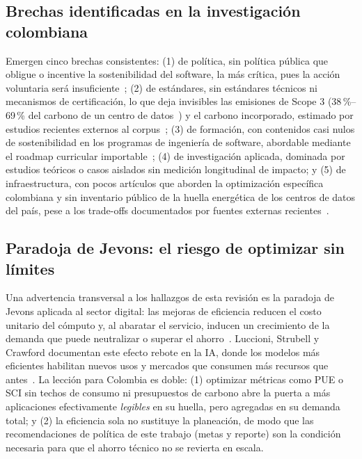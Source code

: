 \documentclass[conference]{IEEEtran}
\begin{document}
\subsection{Brechas identificadas en la investigaci\'on colombiana}\label{sec:brechasdis}
Emergen cinco brechas consistentes: (1) de pol\'itica, sin pol\'itica p\'ublica que obligue o incentive la sostenibilidad del software, la m\'as cr\'itica, pues la acci\'on voluntaria ser\'a insuficiente~\cite{maji2025}; (2) de est\'andares, sin est\'andares t\'ecnicos ni mecanismos de certificaci\'on, lo que deja invisibles las emisiones de Scope 3 (38\,\%--69\,\% del carbono de un centro de datos~\cite{lin2023}) y el carbono incorporado, estimado por estudios recientes externos al corpus~\cite{eilam2024}; (3) de formaci\'on, con contenidos casi nulos de sostenibilidad en los programas de ingenier\'ia de software, abordable mediante el roadmap curricular importable~\cite{moreira2024}; (4) de investigaci\'on aplicada, dominada por estudios te\'oricos o casos aislados sin medici\'on longitudinal de impacto; y (5) de infraestructura, con pocos art\'iculos que aborden la optimizaci\'on espec\'ifica colombiana y sin inventario p\'ublico de la huella energ\'etica de los centros de datos del pa\'is, pese a los trade-offs documentados por fuentes externas recientes~\cite{gnibga2024,torres2026}.

\subsection{Paradoja de Jevons: el riesgo de optimizar sin l\'imites}\label{sec:jevons}
Una advertencia transversal a los hallazgos de esta revisi\'on es la paradoja de Jevons aplicada al sector digital: las mejoras de eficiencia reducen el costo unitario del c\'omputo y, al abaratar el servicio, inducen un crecimiento de la demanda que puede neutralizar o superar el ahorro~\cite{lange2021jevons}. Luccioni, Strubell y Crawford documentan este efecto rebote en la IA, donde los modelos m\'as eficientes habilitan nuevos usos y mercados que consumen m\'as recursos que antes~\cite{luccioni2025jevons}. La lecci\'on para Colombia es doble: (1) optimizar m\'etricas como PUE o SCI sin techos de consumo ni presupuestos de carbono abre la puerta a m\'as aplicaciones efectivamente \emph{legibles} en su huella, pero agregadas en su demanda total; y (2) la eficiencia sola no sustituye la planeaci\'on, de modo que las recomendaciones de pol\'itica de este trabajo (metas y reporte) son la condici\'on necesaria para que el ahorro t\'ecnico no se revierta en escala.
\end{document}
